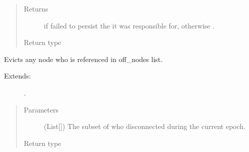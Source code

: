 \documentclass[letterpaper,10pt,english]{sphinxmanual}
\begin{document}
\begin{fulllineitems}
\begin{fulllineitems}
\begin{quote}
\begin{description}
\item[{Returns}] \leavevmode
{} if  failed to persist the  it
was responsible for, otherwise .

\item[{Return type}] \leavevmode
{}

\end{description}\end{quote}

\end{fulllineitems}


\begin{fulllineitems}
\label{\detokenize{app.domain:app.domain.cluster_groups.SGCluster.maintain}}
Evicts any node who is referenced in off\_nodes list.
\begin{description}
\item[{Extends:}] \leavevmode
{\hyperref[\detokenize{app.domain:app.domain.cluster_groups.Cluster.maintain}]{}}.

\end{description}
\begin{quote}\begin{description}
\item[{Parameters}] \leavevmode
{} (List{[}{\hyperref[\detokenize{app:app.type_hints.NodeType}]{}}{]}) \textendash{} The subset of {\hyperref[\detokenize{app.domain:app.domain.cluster_groups.Cluster.members}]{}} who disconnected
during the current epoch.

\item[{Return type}] \leavevmode
{}

\end{description}\end{quote}

\end{fulllineitems}


\end{fulllineitems}
\end{document}
